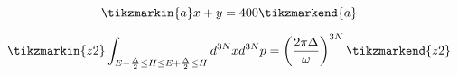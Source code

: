 \documentclass{article}
\begin{document}

\[\tikzmarkin{a}x + y = 400\tikzmarkend{a}\]

\[
\tikzmarkin{z2}
\int_{
E - \frac{\Delta}{2} \le H \le E + \frac{\Delta}{2} \le H
}
 d^{3N} x d^{3N} p
=
\left( \frac{2 \pi \Delta}{\omega} \right)^{3N}
\tikzmarkend{z2}
\]
\end{document}
